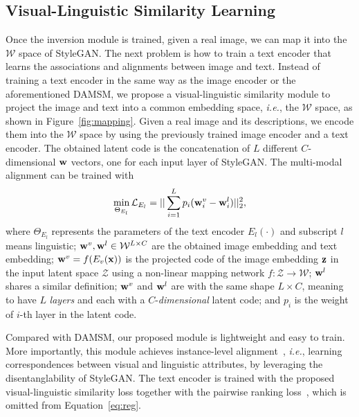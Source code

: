 \documentclass[final]{cvpr}
\newcommand{\w}{{\rm\bf w}}
\newcommand{\W}{\mathcal{W}}
\newcommand{\x}{{\rm\bf x}}
\newcommand{\Loss}{\mathcal{L}}
\newcommand{\z}{{\rm\bf z}}
\newcommand{\Z}{\mathcal{Z}}
\def\ie{\emph{i.e.}}
\begin{document}
\subsection{Visual-Linguistic Similarity Learning}
\label{subsec:vls-model}

Once the inversion module is trained, given a real image, we can map it into the $\mathcal{W}$ space of StyleGAN. 
The next problem is how to train a text encoder that learns the associations and alignments between image and text.
Instead of training a text encoder in the same way as the image encoder or the aforementioned DAMSM, we propose a visual-linguistic similarity module to project the image and text into a common embedding space, \ie, the $\W$ space, as shown in Figure~\ref{fig:mapping}.
Given a real image and its descriptions, we encode them into the $\W$ space by using the previously trained image encoder and a text encoder. 
The obtained latent code is the concatenation of $L$ different $C$-dimensional $\w$ vectors, one for each input layer of StyleGAN.
The multi-modal alignment can be trained with 
\begin{align}
  \min_{\Theta_{E_l}}\Loss_{E_l} = ||\sum_{i=1}^{L} p_i (\w^v_i - \w^l_i)||_2^2, 
  \label{eq:reg}
\end{align}
where $\Theta_{E_l}$ represents the parameters of the text encoder $E_l(\cdot)$ and subscript $l$ means linguistic;
$\w^v, \w^l \in \W^{L \times C}$ are the obtained image embedding and text embedding; 
$\w^v = f(E_v(\x))$ is the projected code of the image embedding $\z$ in the input latent space $\Z$ using a non-linear mapping network $f:\Z \to \W$; $\w^l$ shares a similar definition;
$\w^v$ and $\w^l$ are with the same shape $L \times C$, meaning to have $L$ \textit{layers} and each with a $C$-\textit{dimensional} latent code;
and $p_i$ is the weight of $i$-th layer in the latent code.

Compared with DAMSM, our proposed module is lightweight and easy to train. More importantly, this module achieves instance-level alignment~\cite{Wang2020CVSE}, \ie, learning correspondences between visual and linguistic attributes, by leveraging the disentanglability of StyleGAN.
The text encoder is trained with the proposed visual-linguistic similarity loss together with the pairwise ranking loss~\cite{kiros2014unifying,dong2017semantic}, which is omitted from Equation~\ref{eq:reg}.
\end{document}
